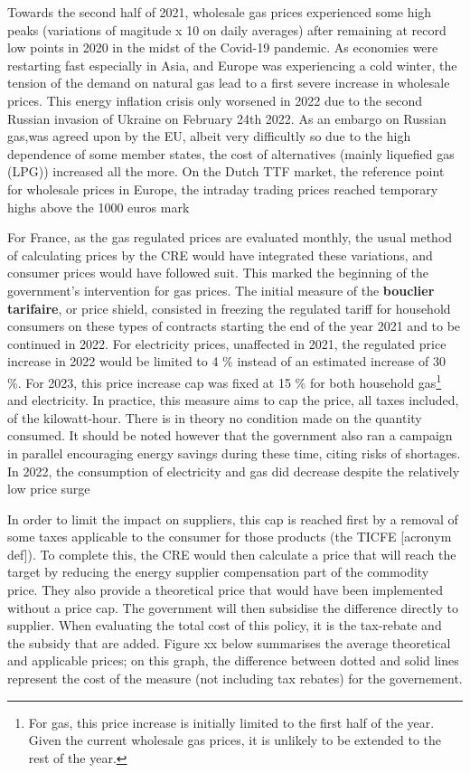 \documentclass[
  letterpaper,
  DIV=11,
  numbers=noendperiod]{scrartcl}
\begin{document}
Towards the second half of 2021, wholesale gas prices experienced some
high peaks (variations of magitude x 10 on daily averages) after
remaining at record low points in 2020 in the midst of the Covid-19
pandemic. As economies were restarting fast especially in Asia, and
Europe was experiencing a cold winter, the tension of the demand on
natural gas lead to a first severe increase in wholesale prices. This
energy inflation crisis only worsened in 2022 due to the second Russian
invasion of Ukraine on February 24th 2022. As an embargo on Russian
gas,was agreed upon by the EU, albeit very difficultly so due to the
high dependence of some member states, the cost of alternatives (mainly
liquefied gas (LPG)) increased all the more. On the Dutch TTF market,
the reference point for wholesale prices in Europe, the intraday trading
prices reached temporary highs above the 1000 euros mark

For France, as the gas regulated prices are evaluated monthly, the usual
method of calculating prices by the CRE would have integrated these
variations, and consumer prices would have followed suit. This marked
the beginning of the government's intervention for gas prices. The
initial measure of the \textbf{bouclier tarifaire}, or price shield,
consisted in freezing the regulated tariff for household consumers on
these types of contracts starting the end of the year 2021 and to be
continued in 2022. For electricity prices, unaffected in 2021, the
regulated price increase in 2022 would be limited to 4 \% instead of an
estimated increase of 30 \%. For 2023, this price increase cap was fixed
at 15 \% for both household gas\footnote{For gas, this price increase is
  initially limited to the first half of the year. Given the current
  wholesale gas prices, it is unlikely to be extended to the rest of the
  year.} and electricity. In practice, this measure aims to cap the
price, all taxes included, of the kilowatt-hour. There is in theory no
condition made on the quantity consumed. It should be noted however that
the government also ran a campaign in parallel encouraging energy
savings during these time, citing risks of shortages. In 2022, the
consumption of electricity and gas did decrease despite the relatively
low price surge

In order to limit the impact on suppliers, this cap is reached first by
a removal of some taxes applicable to the consumer for those products
(the TICFE {[}acronym def{]}). To complete this, the CRE would then
calculate a price that will reach the target by reducing the energy
supplier compensation part of the commodity price. They also provide a
theoretical price that would have been implemented without a price cap.
The government will then subsidise the difference directly to supplier.
When evaluating the total cost of this policy, it is the tax-rebate and
the subsidy that are added. Figure xx below summarises the average
theoretical and applicable prices; on this graph, the difference between
dotted and solid lines represent the cost of the measure (not including
tax rebates) for the governement.
\end{document}

